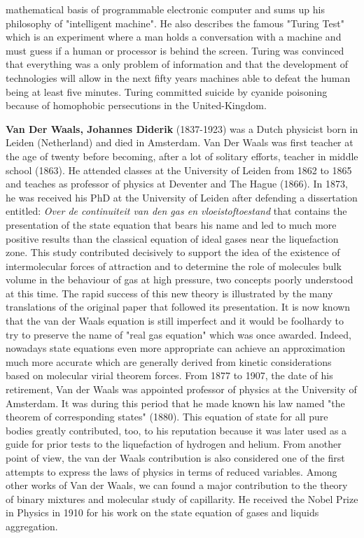 mathematical basis of programmable electronic computer and sums up his philosophy of "intelligent machine". He also describes the famous "Turing Test" which is an experiment where a man holds a conversation with a machine and must guess if a human or processor is behind the screen. Turing was convinced that everything was a only problem of information and that the development of technologies will allow in the next fifty years machines able to defeat the human being at least five minutes. Turing committed suicide by cyanide poisoning because of homophobic persecutions in the United-Kingdom.

{}
\label{sec:V}

\textbf{Van Der Waals, Johannes Diderik} (1837-1923) was a Dutch physicist born in Leiden (Netherland) and died in Amsterdam. Van Der Waals was first teacher at the age of twenty before becoming, after a lot of solitary efforts, teacher in middle school (1863). He attended classes at the University of Leiden from 1862 to 1865 and teaches as professor of physics at Deventer and The Hague (1866). In 1873, he was received his PhD at the University of Leiden after defending a dissertation entitled: \textit{Over de continuiteit van den gas en vloeistoftoestand} that contains the presentation of the state equation that bears his name and led to much more positive results than the classical equation of ideal gases near the liquefaction zone. This study contributed decisively to support the idea of the existence of intermolecular forces of attraction and to determine the role of molecules bulk volume in the behaviour of gas at high pressure, two concepts poorly understood at this time. The rapid success of this new theory is illustrated by the many translations of the original paper that followed its presentation. It is now known that the van der Waals equation is still imperfect and it would be foolhardy to try to preserve the name of "real gas equation" which was once awarded. Indeed, nowadays state equations even more appropriate can achieve an approximation much more accurate which are generally derived from kinetic considerations based on molecular virial theorem forces. From 1877 to 1907, the date of his retirement, Van der Waals was appointed professor of physics at the University of Amsterdam. It was during this period that he made known his law named "the theorem of corresponding states" (1880). This equation of state for all pure bodies greatly contributed, too, to his reputation because it was later used as a guide for prior tests to the liquefaction of hydrogen and helium. From another point of view, the van der Waals contribution is also considered one of the first attempts to express the laws of physics in terms of reduced variables. Among other works of Van der Waals, we can found a major contribution to the theory of binary mixtures and molecular study of capillarity. He received the Nobel Prize in Physics in 1910 for his work on the state equation of gases and liquids aggregation.

